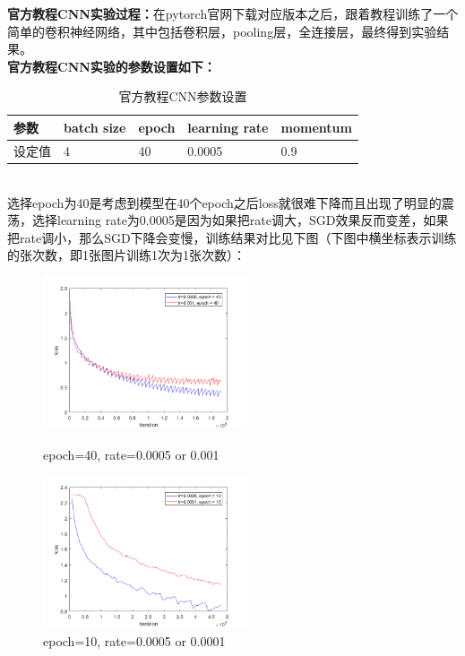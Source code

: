 \documentclass[a4paper,UTF8]{article}
\numberwithin{equation}{section}
\begin{document}
\begin{enumerate}
\textbf{官方教程CNN实验过程：}在pytorch官网下载对应版本之后，跟着教程训练了一个简单的卷积神经网络，其中包括卷积层，pooling层，全连接层，最终得到实验结果。\\
\textbf{官方教程CNN实验的参数设置如下：}
\begin{table}[h]
	\centering
	\caption{官方教程CNN参数设置}
	\label{cn1}
	\begin{tabular}{|l|l|l|l|l|}
		\hline
		参数	& batch size & epoch & learning rate & momentum \\ \hline
		设定值	& 4 & 40 & 0.0005 & 0.9 \\ \hline
	\end{tabular}
\end{table}\\
选择epoch为40是考虑到模型在40个epoch之后loss就很难下降而且出现了明显的震荡，选择learning rate为0.0005是因为如果把rate调大，SGD效果反而变差，如果把rate调小，那么SGD下降会变慢，训练结果对比见下图（下图中横坐标表示训练的张次数，即1张图片训练1次为1张次数）：
\begin{figure}[htbp]
	\centering
	\begin{minipage}[t]{0.48\textwidth}
		\centering
		\includegraphics[width=6cm]{net-0005-001-40.png}
		\caption{epoch=40, rate=0.0005 or 0.001}
	\end{minipage}
	\begin{minipage}[t]{0.48\textwidth}
		\centering
		\includegraphics[width=6cm]{net-0005-0001-10.png}
		\caption{epoch=10, rate=0.0005 or 0.0001}
	\end{minipage}
\end{figure}\\

\end{enumerate}
\end{document}
